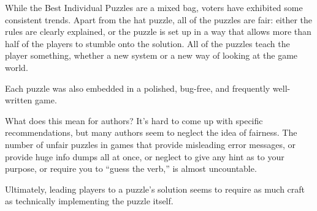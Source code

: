 While the Best Individual Puzzles are a mixed bag, voters have exhibited some consistent trends. Apart from the hat puzzle, all of the puzzles are fair: either the rules are clearly explained, or the puzzle is set up in a way that allows more than half of the players to stumble onto the solution. All of the puzzles teach the player something, whether a new system or a new way of looking at the game world. 

Each puzzle was also embedded in a polished, bug-free, and frequently well-written game.

What does this mean for authors? It’s hard to come up with specific recommendations, but many authors seem to neglect the idea of fairness. The number of unfair puzzles in games that provide misleading error messages, or provide huge info dumps all at once, or neglect to give any hint as to your purpose, or require you to “guess the verb,” is almost uncountable. 

Ultimately, leading players to a puzzle’s solution seems to require as much
craft as technically implementing the puzzle itself.

